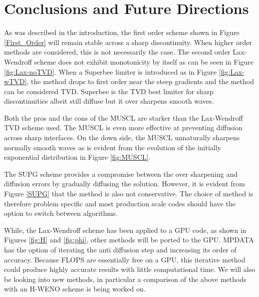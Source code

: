 \section{Conclusions and Future Directions}
\label{conclusions}

As was described in the introduction, the first order scheme shown in Figure \ref{First_Order} will remain stable across a sharp discontinuity. When higher order methods are considered, this is not necessarily the case. The second order Lax-Wendroff scheme does not exhibit monotonicity by itself as can be seen in Figure \ref{fig:Lax-noTVD}. When a Superbee limiter is introduced as in Figure \ref{fig:Lax-wTVD}, the method drops to first order near the steep gradients and the method can be considered TVD. Superbee is the TVD best limiter for sharp discontinuities albeit still diffuse but it over sharpens smooth waves.

Both the pros and the cons of the MUSCL are starker than the Lax-Wendroff TVD scheme used. The MUSCL is even more effective at preventing diffusion across sharp interfaces. On the down side, the MUSCL unnaturally sharpens normally smooth waves as is evident from the evolution of the initially exponential distribution in Figure \ref{fig:MUSCL}. 

The SUPG scheme provides a compromise between the over sharpening and diffusion errors by gradually diffusing the solution. However, it is evident from Figure \ref{SUPG} that the method is also not conservative. The choice of method is therefore problem specific and most production scale codes should have the option to switch between algorithms.

While, the Lax-Wendroff scheme has been applied to a GPU code, as shown in Figures \ref{fig:H} and \ref{fig:phi}, other methods will be ported to the GPU. MPDATA has the option of iterating the anti diffusion step and increasing its order of accuracy. Because FLOPS are essentially free on a GPU, this iterative method could produce highly accurate results with little computational time. We will also be looking into new methods, in particular a comparison of the above methods with an H-WENO scheme is being worked on.